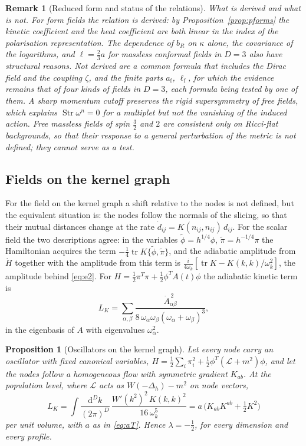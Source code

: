 \documentclass[11pt,a4paper]{article}
\theoremstyle{stmt}
\newtheorem{proposition}[theorem]{Proposition}
\theoremstyle{defn}
\theoremstyle{rmk}
\newtheorem{remark}[theorem]{Remark}
\numberwithin{equation}{section}
\newcommand{\Lc}{\mathcal{L}}
\newcommand{\dd}{\mathrm{d}}
\begin{document}
\begin{remark}[Reduced form and status of the relations]
\emph{What is derived and what is not.} For form fields the relation is derived: by Proposition~\ref{prop:pforms} the kinetic coefficient and the heat coefficient are both linear in the index of the polarisation representation. The dependence of $b_R$ on $\kappa$ alone, the covariance of the logarithms, and $\ell=\tfrac23a$ for massless conformal fields in $D=3$ also have structural reasons. Not derived are a common formula that includes the Dirac field and the coupling $\zeta$, and the finite parts $a_{\mathrm f}$, $\ell_{\mathrm f}$, for which the evidence remains that of four kinds of fields in $D=3$, each formula being tested by one of them. A sharp momentum cutoff preserves the rigid supersymmetry of free fields, which explains $\operatorname{Str}\omega^n=0$ for a multiplet but not the vanishing of the induced action. Free massless fields of spin $\tfrac32$ and $2$ are consistent only on Ricci-flat backgrounds, so that their response to a general perturbation of the metric is not defined; they cannot serve as a test.
\end{remark}

\subsection{Fields on the kernel graph}\label{sec:graphfields}

For the field on the kernel graph a shift relative to the nodes is not defined, but the equivalent situation is: the nodes follow the normals of the slicing, so that their mutual distances change at the rate $\dot d_{ij}=K(n_{ij},n_{ij})\,d_{ij}$. For the scalar field the two descriptions agree: in the variables $\tilde\phi=h^{1/4}\phi$, $\tilde\pi=h^{-1/4}\pi$ the Hamiltonian acquires the term $-\tfrac14\operatorname{tr}K\{\tilde\phi,\tilde\pi\}$, and the adiabatic amplitude from $\dot H$ together with the amplitude from this term is $\tfrac{i}{4\omega_k}[\operatorname{tr}K-K(k,k)/\omega_k^2]$, the amplitude behind \eqref{eq:e2}. For $H=\tfrac12\pi^{T}\pi+\tfrac12\phi^{T}A(t)\phi$ the adiabatic kinetic term is
\begin{equation}\label{eq:adiab}
L_K=\sum_{\alpha,\beta}\frac{\dot A_{\alpha\beta}^{\,2}}{8\,\omega_\alpha\omega_\beta(\omega_\alpha+\omega_\beta)^3},
\end{equation}
in the eigenbasis of $A$ with eigenvalues $\omega_\alpha^2$.

\begin{proposition}[Oscillators on the kernel graph]\label{prop:graphlong}
Let every node carry an oscillator with fixed canonical variables, $H=\tfrac12\sum_i\pi_i^2+\tfrac12\phi^{T}(\Lc+m^2)\phi$, and let the nodes follow a homogeneous flow with symmetric gradient $K_{ab}$. At the population level, where $\Lc$ acts as $W(-\Delta_h)-m^2$ on node vectors,
\begin{equation}\label{eq:graphlong}
L_K=\int\frac{\dd^Dk}{(2\pi)^D}\,\frac{W'(k^2)^2\,K(k,k)^2}{16\,\omega_k^5}=a\,\Big(K_{ab}K^{ab}+\tfrac12K^2\Big)
\end{equation}
per unit volume, with $a$ as in \eqref{eq:aT}. Hence $\lambda=-\tfrac12$, for every dimension and every profile.
\end{proposition}
\end{document}
